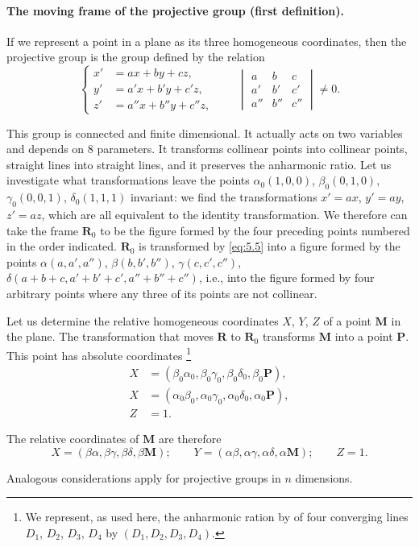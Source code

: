 \paragraph{The moving frame of the projective group (first definition).}
\label{sec:66}
If we represent a point in a plane as its three homogeneous coordinates, then the projective group is the group defined by the relation
\begin{equation}
  \label{eq:5.5}
  \left\{
    \begin{aligned}
      x'&=ax+by+cz,\\
      y'&=a'x+b'y+c'z,\\
      z'&=a''x+b''y+c''z,
    \end{aligned}
  \right.\qquad
  \begin{vmatrix}
    a&b&c\\
    a'&b'&c'\\
    a''&b''&c''
  \end{vmatrix}
  \neq 0.
\end{equation}

{\small

This group is connected and finite dimensional. It actually acts on two variables and depends on $8$ parameters. It transforms collinear points into collinear points, straight lines into straight lines, and it preserves the anharmonic ratio. Let us investigate what transformations leave the points $\alpha_{0}(1,0,0)$, $\beta_{0}(0,1,0)$, $\gamma_{0}(0,0,1)$, $\delta_{0}(1,1,1)$ invariant: we find the transformations $x'=ax$, $y'=ay$, $z'=az$, which are all equivalent to the identity transformation. We therefore can take the frame $\mathbf{R}_{0}$ to be the figure formed by the four preceding points numbered in the order indicated. $\mathbf{R}_{0}$ is transformed by \eqref{eq:5.5} into a figure formed by the points $\alpha(a,a',a'')$, $\beta(b,b',b'')$, $\gamma(c,c',c'')$, $\delta(a+b+c,a'+b'+c',a''+b''+c'')$, i.e., into the figure formed by four arbitrary points where any three of its points are not collinear.

Let us determine the relative homogeneous coordinates $X$, $Y$, $Z$ of a point $\mathbf{M}$ in the plane. The transformation that moves $\mathbf{R}$ to $\mathbf{R}_{0}$ transforms $\mathbf{M}$ into a point $\mathbf{P}$. This point has absolute coordinates \footnote{We represent, as used here, the anharmonic ration by of four converging lines $D_{1}$, $D_{2}$, $D_{3}$, $D_{4}$ by $(D_{1},D_{2},D_{3},D_{4})$.}
\begin{align*}
  X&=(\beta_{0}\alpha_{0},\beta_{0}\gamma_{0},\beta_{0}\delta_{0},\beta_{0}\mathbf{P}),\\
  X&=(\alpha_{0}\beta_{0},\alpha_{0}\gamma_{0},\alpha_{0}\delta_{0},\alpha_{0}\mathbf{P}),\\
  Z&=1.
\end{align*}

The relative coordinates of $\mathbf{M}$ are therefore
\[
X=(\beta\alpha,\beta\gamma,\beta\delta,\beta\mathbf{M});\qquad Y=(\alpha\beta,\alpha\gamma,\alpha\delta,\alpha\mathbf{M});\qquad Z=1.
\]

Analogous considerations apply for projective groups in $n$ dimensions.}

